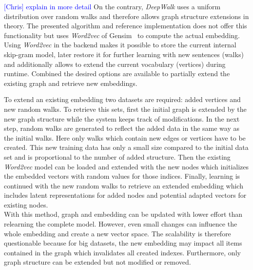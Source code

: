 \documentclass[sigconf]{acmart}
\newcommand{\ce}[1]{\textcolor{blue}{[Chris] #1}}
\newcommand{\ce}[1]{}
\begin{document}
\ce{explain in more detail}
On the contrary, \emph{DeepWalk} uses a uniform distribution over random walks and therefore allows graph structure extensions in theory. The presented algorithm and reference implementation does not offer this functionality but uses \emph{Word2vec} of Gensim~\cite{rehurek_lrec} to compute the actual embedding. Using \emph{Word2vec} in the backend makes it possible to store the current internal skip-gram model, later restore it for further learning with new sentences (walks) and additionally allows to extend the current vocabulary (vertices) during runtime. Combined the desired options are available to partially extend the existing graph and retrieve new embeddings.

To extend an existing embedding two datasets are required: added vertices and new random walks. To retrieve this sets, first the initial graph is extended by the new graph structure while the system keeps track of modifications. In the next step, random walks are generated to reflect the added data in the same way as the initial walks. Here only walks which contain new edges or vertices have to be created. This new training data has only a small size compared to the initial data set and is proportional to the number of added structure. Then the existing \emph{Word2vec} model can be loaded and extended with the new nodes which initializes the embedded vectors with random values for those indices. Finally, learning is continued with the new random walks to retrieve an extended embedding which includes latent representations for added nodes and potential adapted vectors for existing nodes. \\


With this method, graph and embedding can be updated with lower effort than relearning the complete model. However, even small changes can influence the whole embedding and create a new vector space. The scalability is therefore questionable because for big datasets, the new embedding may impact all items contained in the graph which invalidates all created indexes. Furthermore, only graph structure can be extended but not modified or removed. \\

\end{document}
